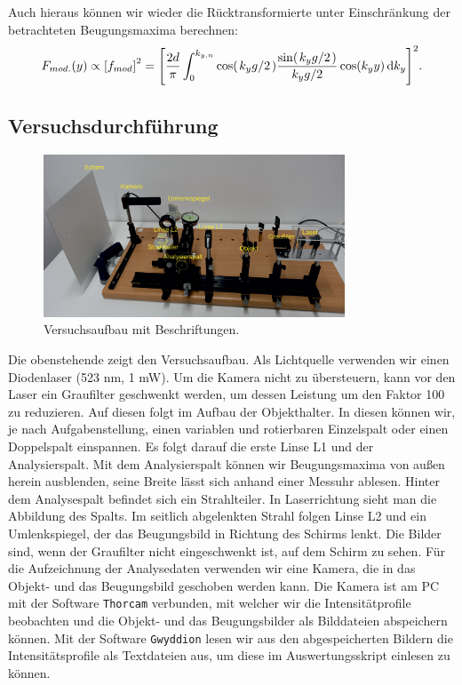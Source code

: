 Auch hieraus können wir wieder die Rücktransformierte unter Einschränkung der betrachteten Beugungsmaxima berechnen:
\begin{align}
  F_{mod.}(y) \propto \qty[f_{mod}]^2 = \qty[\frac{2d}{\pi} \int_0^{k_{y,n}} \cos(\ffrac{k_y g}{2}) \frac{\sin(\ffrac{k_y g}{2})}{\ffrac{k_y g}{2}} \cos(k_y y) \dd{k_y}]^2.
\end{align}

\newpage
\subsection{Versuchsdurchführung}

\begin{figure}[H]
  \centering
    \includegraphics[width=0.8\textwidth]{files/versuchsaufbau_text.png}
    \caption{Versuchsaufbau mit Beschriftungen.}
    \label{fig:versuchsaufbau_text}
\end{figure}

Die obenstehende  zeigt den Versuchsaufbau. Als Lichtquelle verwenden wir einen Diodenlaser (523 nm, 1 mW). Um die Kamera nicht zu übersteuern, kann vor den Laser ein Graufilter geschwenkt werden, um dessen Leistung um den Faktor 100 zu reduzieren. Auf diesen folgt im Aufbau der Objekthalter. In diesen können wir, je nach Aufgabenstellung, einen variablen und rotierbaren Einzelspalt oder einen Doppelspalt einspannen. Es folgt darauf die erste Linse L1 und der Analysierspalt. Mit dem Analysierspalt können wir Beugungsmaxima von außen herein ausblenden, seine Breite lässt sich anhand einer Messuhr ablesen. Hinter dem Analysespalt befindet sich ein Strahlteiler. In Laser­richtung sieht man die Abbildung des Spalts. Im seitlich abgelenkten Strahl folgen Linse L2 und ein Umlenkspiegel, der das Beugungsbild in Richtung des Schirms lenkt. Die Bilder sind, wenn der Graufilter nicht eingeschwenkt ist, auf dem Schirm zu sehen. Für die Aufzeichnung der Analysedaten verwenden wir eine Kamera, die in das Objekt- und das Beugungsbild geschoben werden kann. Die Kamera ist am PC mit der Software \texttt{Thorcam} verbunden, mit welcher wir die Intensitätprofile beobachten und die Objekt- und das Beugungsbilder als Bilddateien abspeichern können. Mit der Software \texttt{Gwyddion} lesen wir aus den abgespeicherten Bildern die Intensitätsprofile als Textdateien aus, um diese im Auswertungsskript einlesen zu können. 

